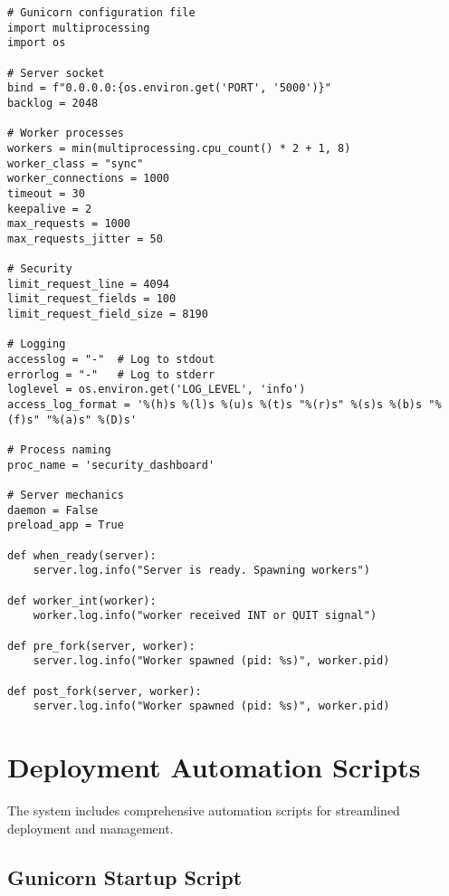 \documentclass[12pt,a4paper]{report}
\begin{document}
\begin{lstlisting}[style=pythonstyle, caption=Gunicorn Configuration]
# Gunicorn configuration file
import multiprocessing
import os

# Server socket
bind = f"0.0.0.0:{os.environ.get('PORT', '5000')}"
backlog = 2048

# Worker processes
workers = min(multiprocessing.cpu_count() * 2 + 1, 8)
worker_class = "sync"
worker_connections = 1000
timeout = 30
keepalive = 2
max_requests = 1000
max_requests_jitter = 50

# Security
limit_request_line = 4094
limit_request_fields = 100
limit_request_field_size = 8190

# Logging
accesslog = "-"  # Log to stdout
errorlog = "-"   # Log to stderr
loglevel = os.environ.get('LOG_LEVEL', 'info')
access_log_format = '%(h)s %(l)s %(u)s %(t)s "%(r)s" %(s)s %(b)s "%(f)s" "%(a)s" %(D)s'

# Process naming
proc_name = 'security_dashboard'

# Server mechanics
daemon = False
preload_app = True

def when_ready(server):
    server.log.info("Server is ready. Spawning workers")

def worker_int(worker):
    worker.log.info("worker received INT or QUIT signal")

def pre_fork(server, worker):
    server.log.info("Worker spawned (pid: %s)", worker.pid)

def post_fork(server, worker):
    server.log.info("Worker spawned (pid: %s)", worker.pid)
\end{lstlisting}

\section{Deployment Automation Scripts}

The system includes comprehensive automation scripts for streamlined deployment and management.

\subsection{Gunicorn Startup Script}
\end{document}
